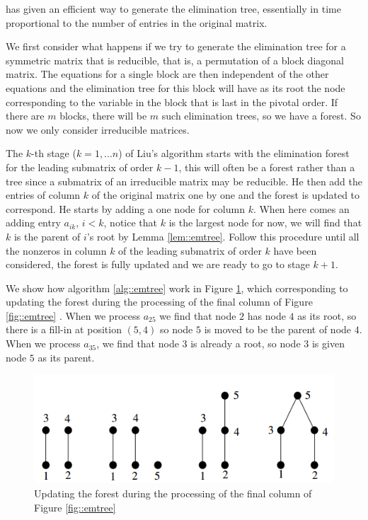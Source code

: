 \begin{alg}
    \label{alg::emtree}
    \cite{Liu1986} has given an efficient way to generate the 
    elimination tree, essentially in time proportional to the 
    number of entries in the original matrix.

    We first consider what happens if we try to generate the
    elimination tree for a symmetric matrix that is reducible, 
    that is, a permutation of a block diagonal matrix. The 
    equations for a single block are then independent of the 
    other equations and the elimination tree for this block 
    will have as its root the node corresponding to the 
    variable in the block that is last in the pivotal order. If 
    there are $m$ blocks, there will be $m$ such elimination 
    trees, so we have a forest. So now we only consider 
    irreducible matrices.

    The $k$-th stage ($k=1,...n$) of Liu's algorithm starts 
    with the elimination forest for the leading submatrix of 
    order $k-1$, this will often be a forest rather than a tree 
    since a submatrix of an irreducible matrix may be 
    reducible. He then add the entries of column $k$ of the 
    original matrix one by one and the forest is updated to 
    correspond. He starts by adding a one node for column $k$. 
    When here comes an adding entry $a_{ik},\,i<k$, notice 
    that $k$ is the largest node for now, we will find that $k$ 
    is the parent of $i$'s root by Lemma \ref{lem::emtree}. 
    Follow this procedure until all the nonzeros in column $k$ 
    of the leading submatrix of order $k$ have been considered, 
    the forest is fully updated and we are ready to go to stage 
    $k+1$.
\end{alg}

\begin{exm}
    We show how algorithm \ref{alg::emtree} work in Figure 
    \ref{fig::algemtree}, which corresponding to updating the 
    forest during the processing of the final column of Figure 
    \ref{fig::emtree} . When we process $a_{25}$ we find that 
    node $2$ has node $4$ as its root, so there is a fill-in at 
    position $(5,4)$ so node $5$ is moved to be the parent of 
    node $4$. When we process $a_{35}$, we find that node $3$ 
    is already a root, so node $3$ is given node $5$ as its 
    parent.
    \begin{figure}[H]
        \centering
        \includegraphics[width=0.8\linewidth]{png/algemtree.png}
        \caption{Updating the forest during the processing of 
        the final column of Figure \ref{fig::emtree}}
        \label{fig::algemtree}
    \end{figure}
\end{exm}


